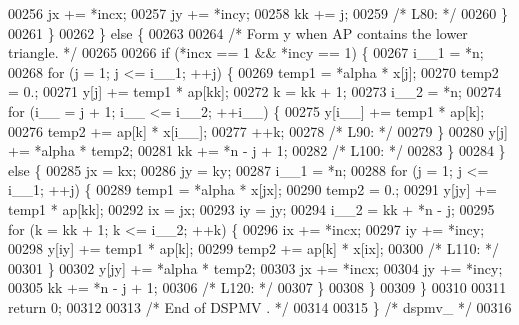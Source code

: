 \begin{DoxyCode}
00256         jx += *incx;
00257         jy += *incy;
00258         kk += j;
00259 \textcolor{comment}{/* L80: */}
00260         \}
00261     \}
00262     \} \textcolor{keywordflow}{else} \{
00263 
00264 \textcolor{comment}{/*        Form  y  when AP contains the lower triangle. */}
00265 
00266     \textcolor{keywordflow}{if} (*incx == 1 && *incy == 1) \{
00267         i\_\_1 = *n;
00268         \textcolor{keywordflow}{for} (j = 1; j <= i\_\_1; ++j) \{
00269         temp1 = *alpha * x[j];
00270         temp2 = 0.;
00271         y[j] += temp1 * ap[kk];
00272         k = kk + 1;
00273         i\_\_2 = *n;
00274         \textcolor{keywordflow}{for} (i\_\_ = j + 1; i\_\_ <= i\_\_2; ++i\_\_) \{
00275             y[i\_\_] += temp1 * ap[k];
00276             temp2 += ap[k] * x[i\_\_];
00277             ++k;
00278 \textcolor{comment}{/* L90: */}
00279         \}
00280         y[j] += *alpha * temp2;
00281         kk += *n - j + 1;
00282 \textcolor{comment}{/* L100: */}
00283         \}
00284     \} \textcolor{keywordflow}{else} \{
00285         jx = kx;
00286         jy = ky;
00287         i\_\_1 = *n;
00288         \textcolor{keywordflow}{for} (j = 1; j <= i\_\_1; ++j) \{
00289         temp1 = *alpha * x[jx];
00290         temp2 = 0.;
00291         y[jy] += temp1 * ap[kk];
00292         ix = jx;
00293         iy = jy;
00294         i\_\_2 = kk + *n - j;
00295         \textcolor{keywordflow}{for} (k = kk + 1; k <= i\_\_2; ++k) \{
00296             ix += *incx;
00297             iy += *incy;
00298             y[iy] += temp1 * ap[k];
00299             temp2 += ap[k] * x[ix];
00300 \textcolor{comment}{/* L110: */}
00301         \}
00302         y[jy] += *alpha * temp2;
00303         jx += *incx;
00304         jy += *incy;
00305         kk += *n - j + 1;
00306 \textcolor{comment}{/* L120: */}
00307         \}
00308     \}
00309     \}
00310 
00311     \textcolor{keywordflow}{return} 0;
00312 
00313 \textcolor{comment}{/*     End of DSPMV . */}
00314 
00315 \} \textcolor{comment}{/* dspmv\_ */}
00316 
\end{DoxyCode}
